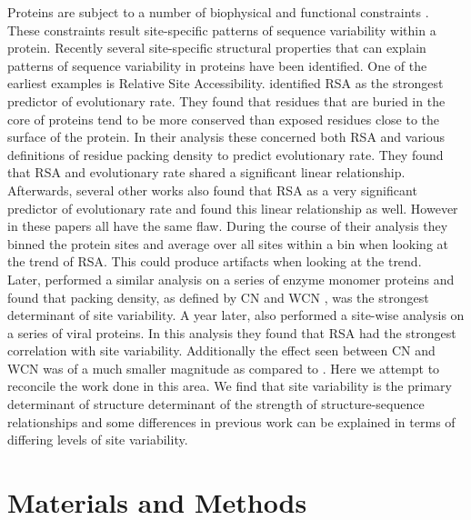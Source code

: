 \documentclass[12pt]{article}
\begin{document}
Proteins are subject to a number of biophysical and functional constraints \citep{Scherreretal2012, Wilkeetal2010}. These constraints result site-specific patterns of sequence variability within a protein. Recently several site-specific structural properties that can explain patterns of sequence variability in proteins have been identified. One of the earliest examples is Relative Site Accessibility. \cite{Fransozaetal2009} identified RSA as the strongest predictor of evolutionary rate. They found that residues that are buried in the core of proteins tend to be more conserved than exposed residues close to the surface of the protein. In their analysis these concerned both RSA and various definitions of residue packing density to predict evolutionary rate. They found that RSA and evolutionary rate shared a significant linear relationship. Afterwards, several other works \citep{Ramseyetal2011, Scherreretal2012} also found that RSA as a very significant predictor of evolutionary rate and found this linear relationship as well. However in these papers all have the same flaw. During the course of their analysis they binned the protein sites and average over all sites within a bin when looking at the trend of RSA. This could produce artifacts when looking at the trend. \\
\indent Later, \cite{Yehetal} performed a similar analysis on a series of enzyme monomer proteins and found that packing density, as defined by CN and WCN \citep{Liaoetal2005, Yehetal2014, Huangetal2014}, was the strongest determinant of site variability. A year later, \cite{Sharamoradietal} also performed a site-wise analysis on a series of viral proteins. In this analysis they found that RSA had the strongest correlation with site variability. Additionally the effect seen between CN and WCN was of a much smaller magnitude as compared to \citep{Yehetal2014}. Here we attempt to reconcile the work done in this area. We find that site variability is the primary determinant of structure determinant of the strength of structure-sequence relationships and some differences in previous work can be explained in terms of differing levels of site variability. \\


\section{Materials and Methods}
\label{sec:mam}
\end{document}
